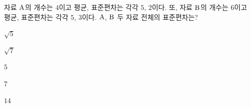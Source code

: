 자료 $\mathrm{A}$의 개수는 $4$이고 평균, 표준편차는 각각 $5$, $2$이다. 또, 자료 $\mathrm{B}$의 개수는 $6$이고 평균, 표준편차는 각각 $5$, $3$이다. $\mathrm{A}$, $\mathrm{B}$ 두 자료 전체의 표준편차는?
\begin{choices32}{\rule[-3ex]{0pt}{8ex}$\sqrt{5}$}{\rule[-3ex]{0pt}{8ex}$\sqrt{7}$}{\rule[-3ex]{0pt}{8ex}$5$}{\rule[-3ex]{0pt}{8ex}$7$}{\rule[-3ex]{0pt}{8ex}$14$}\end{choices32}
